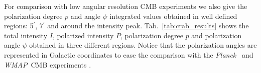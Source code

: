 \documentclass[twocolumn,traditabstract]{aa}
\def\Planck{\textit{Planck}}
\def\WMAP{\textit{WMAP}}
\begin{document}
For comparison with low angular resolution CMB experiments we also give the
polarization degree $p$ and angle $\psi$ integrated values obtained in well
defined regions: 5$^\prime$, 7$^\prime$ and around the intensity peak.
Tab.~\ref{tab:crab_results} shows the total intensity $I$, polarized intensity
$P$, polarization degree $p$ and polarization angle $\psi$ obtained in three
different regions.
Notice that the polarization angles are represented in Galactic coordinates to ease the comparison with the \Planck\ \citep{2015arXiv150702058P} and \WMAP\ CMB experiments \citep{2011ApJS..192...19W}. 
\end{document}
